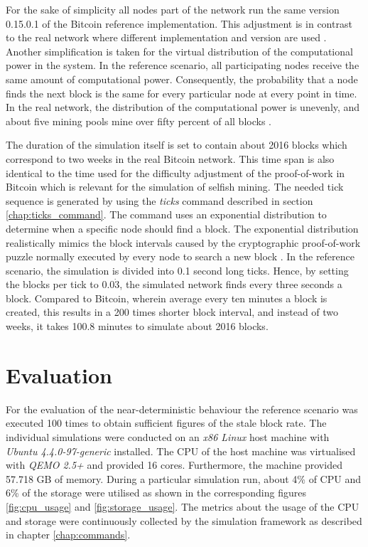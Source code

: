 For the sake of simplicity all nodes part of the network run the same version 0.15.0.1 \cite{bitcoin15} of the Bitcoin reference implementation.
This adjustment is in contrast to the real network where different implementation and version are used \cite{coindancenodes}.
Another simplification is taken for the virtual distribution of the computational power in the system.
In the reference scenario, all participating nodes  receive the same amount of computational power.
Consequently, the probability that a node finds the next block is the same for every particular node at every point in time.
In the real network, the distribution of the computational power is unevenly, and about five mining pools mine over fifty percent of all blocks \cite{gervais2014bitcoin, blockchaininfopools, coindanceblocks, bitcointickerpools}. 

The duration of the simulation itself is set to contain about 2016 blocks which correspond to two weeks in the real Bitcoin network.
This time span is also identical to the time used for the difficulty adjustment of the proof-of-work in Bitcoin which is relevant for the simulation of selfish mining. 
The needed tick sequence is generated by using the \textit{ticks} command described in section \ref{chap:ticks_command}.
The command uses an exponential distribution to determine when a specific node should find a block. 
The exponential distribution realistically mimics the block intervals caused by the cryptographic proof-of-work puzzle normally executed by every node to search a new block \cite{nakamoto2008bitcoin, decker2013information, eyal2014majority}.
In the reference scenario, the simulation is divided into 0.1 second long ticks.
Hence, by setting the blocks per tick to $0.0\dot{3}$, the simulated network finds every three seconds a block.
Compared to Bitcoin, wherein average every ten minutes a block is created, this results in a 200 times shorter block interval, and instead of two weeks, it takes 100.8 minutes to simulate about 2016 blocks.

\section{Evaluation}
\label{chap:evaluation}

For the evaluation of the near-deterministic behaviour the reference scenario was executed 100 times to obtain sufficient figures of the stale block rate.
The individual simulations were conducted on an \textit{x86 Linux} host machine with \textit{Ubuntu 4.4.0-97-generic} installed.
The CPU of the host machine was virtualised with \textit{QEMO 2.5+} and provided 16 cores.
Furthermore, the machine provided 57.718 GB of memory.
During a particular simulation run, about 4\% of CPU and 6\% of the storage were utilised as shown in the corresponding figures \ref{fig:cpu_usage} and \ref{fig:storage_usage}.
The metrics about the usage of the CPU and storage were continuously collected by the simulation framework as described in chapter \ref{chap:commands}.

